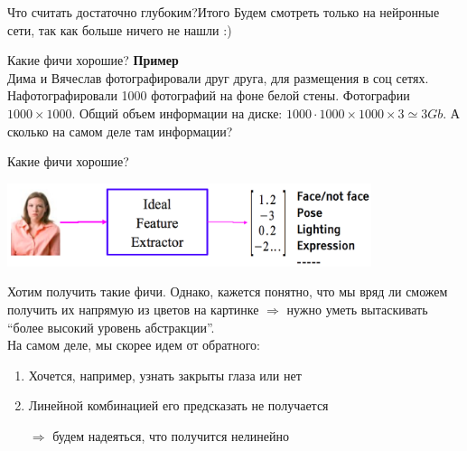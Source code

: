 \documentclass[14pt, fleqn, xcolor={dvipsnames, table}]{beamer}
\begin{document}
\begin{frame}{Что считать достаточно глубоким?}{Итого}\Large
Будем смотреть только на нейронные сети, так как больше ничего не нашли :)
\end{frame}

\begin{frame}{Какие фичи хорошие?}
\small
\textbf{Пример}\\
Дима и Вячеслав фотографировали друг друга, для размещения в соц сетях. Нафотографировали 1000 фотографий на фоне белой стены. Фотографии $1000\times1000$. Общий объем информации на диске: $1000\cdot1000\times1000\times3 \simeq 3Gb$. А сколько на самом деле там информации?
\end{frame}

\begin{frame}{Какие фичи хорошие?}
\begin{center}\includegraphics[width=0.8\textwidth]{faces.png}\end{center}
\small
Хотим получить такие фичи. Однако, кажется понятно, что мы вряд ли сможем получить их напрямую из цветов на картинке $\Rightarrow$ нужно уметь вытаскивать ``более высокий уровень абстракции''.\\
На самом деле, мы скорее идем от обратного:
\begin{enumerate}
  \item Хочется, например, узнать закрыты глаза или нет
  \item Линейной комбинацией его предсказать не получается
  \item[$\Rightarrow$] будем надеяться, что получится нелинейно
\end{enumerate}
\end{frame}
\end{document}
